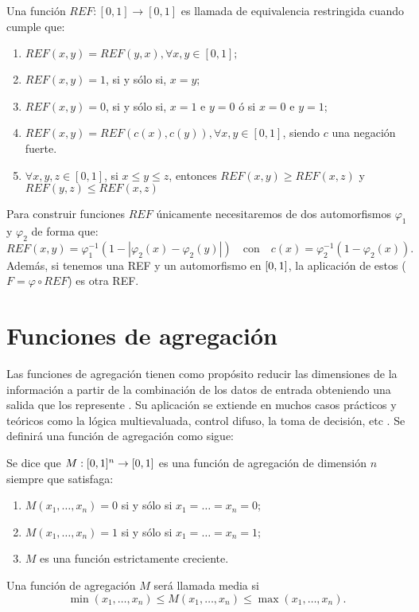 \begin{definition}\label{def:ref}
Una función $REF  : [0, 1] \rightarrow [0, 1]$ es llamada de equivalencia restringida cuando cumple que:
	\begin{enumerate}
	\item $REF(x, y) = REF(y, x), \forall x, y \in [0, 1];$
	\item $REF(x, y) = 1$, si y sólo si, $x=y$;
	\item $REF(x, y) = 0$, si y sólo si, $x=1$ e $y=0$ ó si $x=0$ e $y=1$;
	\item $REF(x, y) = REF(c(x), c(y)),  \forall x, y \in [0, 1]$, siendo $c$ una negación fuerte.
	\item $\forall x, y, z \in [0, 1]$, si $x\leq y\leq z$, entonces $REF(x, y)\geq REF(x, z)$ y  $REF(y, z)\leq REF(x, z)$
	\end{enumerate}
\end{definition}
\begin{proposition}\label{prop:contruccionref}
Para construir funciones $REF$ únicamente necesitaremos de dos automorfismos $\varphi_{1}$ y $\varphi_{2}$ de forma que: 
$$REF(x,y) = \varphi_1^{-1}(1-|\varphi_2(x)-\varphi_2(y)|) \quad\text{con}\quad c(x) = \varphi_2^{-1}(1-\varphi_2(x)).$$ 
Además, si tenemos una REF y un automorfismo en $[0,1]$, la aplicación de estos ($F=\varphi \circ REF$) es otra REF.
\end{proposition}

\section{Funciones de agregación}\label{sec:agregacion}
Las funciones de agregación tienen como propósito reducir las dimensiones de la información a partir de la combinación de los datos de entrada obteniendo una salida que los represente \cite{art:montero, art:calvoagregacion}. Su aplicación se extiende en muchos casos prácticos y teóricos como la lógica multievaluada, control difuso, la toma de decisión, etc \cite{}.  Se definirá una función de agregación como sigue:

\begin{definition}\label{def:agregacion}
Se dice que $M : [0,1]^n \rightarrow [0,1]$ es una función de agregación de dimensión $n$ siempre que satisfaga:
	\begin{enumerate}
	\item $M(x_1, \dots, x_n) = 0$ si y sólo si $x_1=\dots=x_n=0$;
	\item $M(x_1, \dots, x_n) = 1$ si y sólo si $x_1=\dots=x_n=1$;
	\item $M$ es una función estrictamente creciente.
	\end{enumerate}
\end{definition}
\begin{definition}
Una función de agregación $M$ será llamada media si
$$ \min(x_{1}, \dots, x_{n})  \leq M(x_{1}, \dots, x_{n}) \leq \max(x_{1}, \dots, x_{n}).$$
\end{definition}

